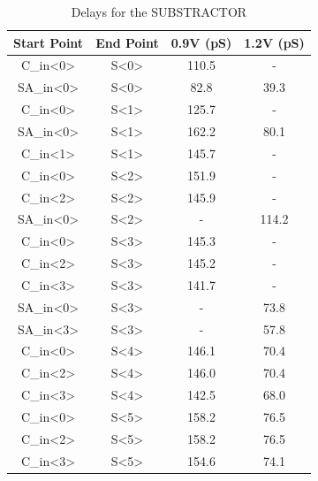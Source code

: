 \documentclass[a4paper,12pt]{article}
\begin{document}
\begin{table}[H]
\caption{Delays for the SUBSTRACTOR}
\begin{tabular}{||c|c|c|c||}
\hline
\textbf{Start Point} & \textbf{End Point} & \textbf{0.9V (pS)} & \textbf{1.2V (pS)} \\
\hline\hline
C\_in<0> & S<0> & 110.5 & - \\
\hline
SA\_in<0> & S<0> & 82.8 & 39.3 \\
\hline
C\_in<0> & S<1> & 125.7 & - \\
\hline
SA\_in<0> & S<1> & 162.2 & 80.1 \\
\hline
C\_in<1> & S<1> & 145.7 & - \\
\hline
C\_in<0> & S<2> & 151.9 & - \\
\hline
C\_in<2> & S<2> & 145.9 & - \\
\hline
SA\_in<0> & S<2> & - & 114.2 \\
\hline
C\_in<0> & S<3> & 145.3 & - \\
\hline
C\_in<2> & S<3> & 145.2 & - \\
\hline
C\_in<3> & S<3> & 141.7 & - \\
\hline
SA\_in<0> & S<3> & - & 73.8 \\
\hline
SA\_in<3> & S<3> & - & 57.8 \\
\hline
C\_in<0> & S<4> & 146.1 & 70.4 \\
\hline
C\_in<2> & S<4> & 146.0 & 70.4 \\
\hline
C\_in<3> & S<4> & 142.5 & 68.0 \\
\hline
C\_in<0> & S<5> & 158.2 & 76.5 \\
\hline
C\_in<2> & S<5> & 158.2 & 76.5 \\
\hline
C\_in<3> & S<5> & 154.6 & 74.1 \\
\hline
\end{tabular}
\end{table}
\end{document}
